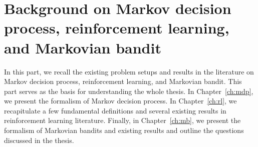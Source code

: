 \documentclass[%
    paper=A4,              %
    twoside=true,          %
    openright,             %
    parskip=half,          %
    chapterprefix=true,    %
    11pt,                  %
    headings=normal,       %
    bibliography=totoc,    %
    listof=totoc,          %
    titlepage=on,          %
    captions=tableabove,   %
    chapterprefix=false,   %
    appendixprefix=false,  %
    draft=false,           %
]{scrreprt}
\newcommand{\KK}[1]{\todo[color=green!10,author=\textbf{\small KK},inline]{\small #1\\}}
\begin{document}

\tableofcontents %
\cleardoublepage %
\fi


\pagestyle{scrheadings}  %




\iftotalcompilation
\part{Background on Markov decision process, reinforcement learning, and Markovian bandit}
\label{part:background}
In this part, we recall the existing problem setups and results in the literature on Markov decision process, reinforcement learning, and Markovian bandit.
This part serves as the basis for understanding the whole thesis.
In Chapter~\ref{ch:mdp}, we present the formalism of Markov decision process.
In Chapter~\ref{ch:rl}, we recapitulate a few fundamental definitions and several existing results in reinforcement learning literature.
Finally, in Chapter~\ref{ch:mb}, we present the formalism of Markovian bandits and existing results and outline the questions discussed in the thesis.

\cleardoublepage %
\clearpage
\fi


\end{document}
